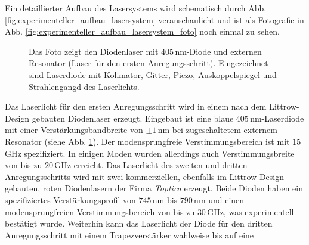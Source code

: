 Ein detaillierter Aufbau des Lasersystems wird schematisch durch Abb.
\ref{fig:experimenteller_aufbau_lasersystem} veranschaulicht und ist als
Fotografie in Abb. \ref{fig:experimenteller_aufbau_lasersystem_foto} noch einmal
zu sehen.\par
\begin{figure}[h]
 	\centering
	\caption[Diodenlaser - Foto]{Das Foto zeigt den Diodenlaser mit
	$405\,$nm-Diode und externen
	Resonator (Laser für den ersten
	Anregungsschritt).
	Eingezeichnet sind
	Laserdiode mit Kolimator,
	Gitter, Piezo,
	Auskoppelspiegel und
	Strahlengangd des
	Laserlichts.}\label{fig:experimenteller_aufbau_diodenlaser_foto}
\end{figure}
Das Laserlicht für den ersten Anregungsschritt wird in einem nach dem
Littrow-Design gebauten Diodenlaser erzeugt. Eingebaut ist eine blaue
$405\,$nm-Laserdiode mit einer Verstärkungsbandbreite von $\pm1\,$nm bei
zugeschaltetem externem Resonator (siehe Abb.
\ref{fig:experimenteller_aufbau_diodenlaser_foto}). Der modensprungfreie
Verstimmungsbereich ist mit $15\,$GHz spezifiziert. In einigen Moden wurden
allerdings auch Verstimmungsbreite von bis zu $20\,$GHz erreicht. Das Laserlicht
des zweiten und dritten Anregungsschritts wird mit zwei kommerziellen, ebenfalls im Littrow-Design gebauten, roten Diodenlasern der Firma \textit{Toptica} erzeugt.
Beide Dioden haben ein spezifiziertes Verstärkungsprofil von
$745\,$nm bis $790\,$nm und einen modensprungfreien Verstimmungsbereich von bis
zu $30\,$GHz, was experimentell bestätigt wurde. Weiterhin kann das Laserlicht
der Diode für den dritten Anregungsschritt mit einem Trapezverstärker wahlweise bis auf eine
